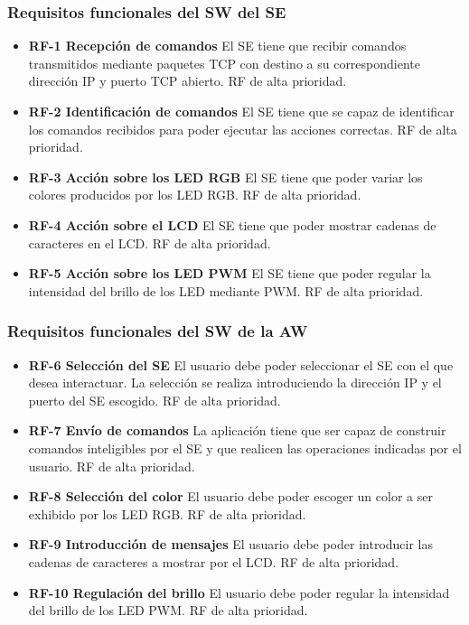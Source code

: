 \subsubsection{Requisitos funcionales del SW del SE}
\label{sec:spec-funcionales-se}
\begin{itemize}
  \item \textbf{RF-1 Recepción de comandos} El SE tiene que recibir comandos
  transmitidos mediante paquetes TCP con destino a su correspondiente dirección
  IP y puerto TCP abierto. RF de alta prioridad.
  \item \textbf{RF-2 Identificación de comandos} El SE tiene que se capaz de
  identificar los comandos recibidos para poder ejecutar las acciones correctas.
  RF de alta prioridad.
  \item \textbf{RF-3 Acción sobre los LED RGB} El SE tiene que poder variar
  los colores producidos por los LED RGB. RF de alta prioridad.
  \item \textbf{RF-4 Acción sobre el LCD} El SE tiene que poder mostrar
  cadenas de caracteres en el LCD. RF de alta prioridad.
  \item \textbf{RF-5 Acción sobre los LED PWM} El SE tiene que poder regular
  la intensidad del brillo de los LED mediante PWM. RF de alta prioridad.
\end{itemize}

\subsubsection{Requisitos funcionales del SW de la AW}
\label{sec:spec-funcionales-aw}
\begin{itemize}
  \item \textbf{RF-6 Selección del SE} El usuario debe poder seleccionar el SE 
  con el que desea interactuar. La selección se realiza introduciendo la
  dirección IP y el puerto del SE escogido. RF de alta prioridad.
  \item \textbf{RF-7 Envío de comandos} La aplicación tiene que ser capaz de
  construir comandos inteligibles por el SE y que realicen las operaciones
  indicadas por el usuario. RF de alta prioridad.
  \item \textbf{RF-8 Selección del color} El usuario debe poder escoger un color
  a ser exhibido por los LED RGB. RF de alta prioridad.
  \item \textbf{RF-9 Introducción de mensajes} El usuario debe poder introducir
  las cadenas de caracteres a mostrar por el LCD. RF de alta prioridad.
  \item \textbf{RF-10 Regulación del brillo} El usuario debe poder regular la
  intensidad del brillo de los LED PWM. RF de alta prioridad.
\end{itemize}

